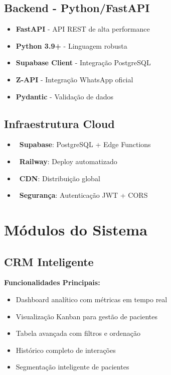 \documentclass[11pt,a4paper]{article}
\newcommand{\sectiontitle}[1]{\section{\color{oraldentsblue}#1}}
\begin{document}
\subsection{Backend - Python/FastAPI}
\begin{tcolorbox}[colback=amber!5!white,colframe=warningamber,title={\faServer\ Tecnologias Backend}]
\begin{itemize}
    \item \textbf{FastAPI} - API REST de alta performance
    \item \textbf{Python 3.9+} - Linguagem robusta
    \item \textbf{Supabase Client} - Integração PostgreSQL
    \item \textbf{Z-API} - Integração WhatsApp oficial
    \item \textbf{Pydantic} - Validação de dados
\end{itemize}
\end{tcolorbox}

\subsection{Infraestrutura Cloud}
\begin{itemize}
    \item \faDatabase\ \textbf{Supabase}: PostgreSQL + Edge Functions
    \item \faCloud\ \textbf{Railway}: Deploy automatizado
    \item \faGlobe\ \textbf{CDN}: Distribuição global
    \item \faLock\ \textbf{Segurança}: Autenticação JWT + CORS
\end{itemize}

\sectiontitle{Módulos do Sistema}

\subsection{CRM Inteligente}
\begin{tcolorbox}[colback=blue!5!white,colframe=oraldentsblue]
\textbf{Funcionalidades Principais:}
\begin{itemize}
    \item Dashboard analítico com métricas em tempo real
    \item Visualização Kanban para gestão de pacientes
    \item Tabela avançada com filtros e ordenação
    \item Histórico completo de interações
    \item Segmentação inteligente de pacientes
\end{itemize}
\end{tcolorbox}
\end{document}
